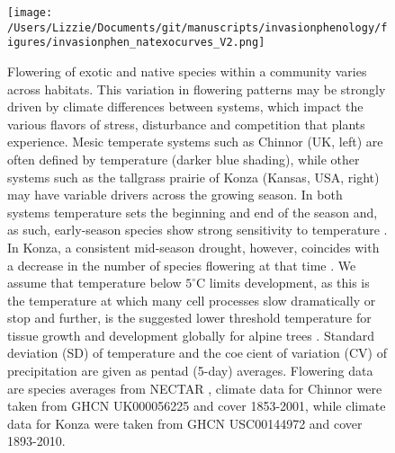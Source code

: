 \documentclass[11pt,a4paper,oneside]{article}
\begin{document}
\newpage
\begin{figure}[h!]
\centering \texttt{[image: /Users/Lizzie/Documents/git/manuscripts/invasionphenology/figures/invasionphen\_natexocurves\_V2.png]}
\caption{Flowering of exotic and native species within a community varies across habitats. This variation in flowering patterns may be strongly driven by climate differences between systems, which impact the various flavors of stress, disturbance and competition that plants experience. Mesic temperate systems such as Chinnor (UK, left) are often defined by temperature (darker blue shading), while other systems such as the tallgrass prairie of Konza (Kansas, USA, right) may have variable drivers across the growing season. In both systems temperature sets the beginning and end of the season and, as such, early-season species show strong sensitivity to temperature \citep{Cook:2012,Craine:2012kl}. In Konza, a consistent mid-season drought, however, coincides with a decrease in the number of species flowering at that time \citep{Craine:2012kl}. We assume that temperature below \(5^{\circ}\mathrm{C}\) limits development, as this is the temperature at which many cell processes slow dramatically or stop \citep{larcher2003} and further, is the suggested lower threshold temperature for tissue growth and development globally for
alpine trees \citep{Korner:1998qf}. Standard deviation (SD)
of temperature and the coecient of variation (CV) of precipitation are given as pentad (5-day)
averages. Flowering data are species averages from NECTAR \citep{nectar}, climate data for Chinnor were taken from GHCN UK000056225 and cover 1853-2001, while climate data for Konza were taken from GHCN USC00144972 and cover 1893-2010.} %
\end{figure}
\end{document}
